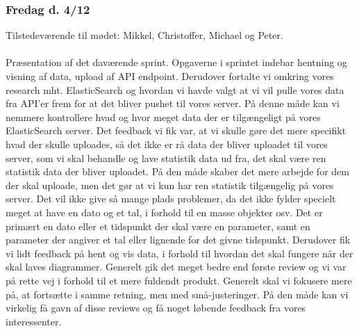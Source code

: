 {\subsubsection{Fredag d. 4/12}
Tilstedeværende til mødet: Mikkel, Christoffer, Michael og Peter.
\\\\
Præsentation af det daværende sprint. Opgaverne i sprintet indebar hentning og visning af data, upload af API endpoint. Derudover fortalte vi omkring vores research mht. ElasticSearch og hvordan vi havde valgt at vi vil pulle vores data fra API'er frem for at det bliver pushet til vores server. På denne måde kan vi nemmere kontrollere hvad og hvor meget data der er tilgængeligt på vores ElasticSearch server.
Det feedback vi fik var, at vi skulle gøre det mere specifikt hvad der skulle uploades, så det ikke er rå data der bliver uploadet til vores server, som vi skal behandle og lave statistik data ud fra, det skal være ren statistik data der bliver uploadet. På den måde skaber det mere arbejde for dem der skal uploade, men det gør at vi kun har ren statistik tilgængelig på vores server. Det vil ikke give så mange plads problemer, da det ikke fylder specielt meget at have en dato og et tal, i forhold til en masse objekter osv. Det er primært en dato eller et tidspunkt der skal være en parameter, samt en parameter der angiver et tal eller lignende for det givne tidspunkt.
Derudover fik vi lidt feedback på hent og vis data, i forhold til hvordan det skal fungere når der skal laves diagrammer.
Generelt gik det meget bedre end første review og vi var på rette vej i forhold til et mere fuldendt produkt. Generelt skal vi fokusere mere på, at fortsætte i samme retning, men med små-justeringer. På den måde kan vi virkelig få gavn af disse reviews og få noget løbende feedback fra vores interessenter.
}
